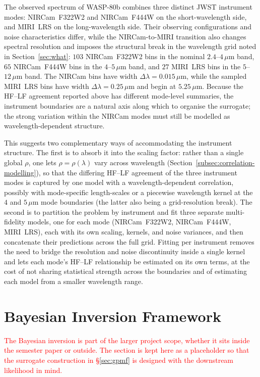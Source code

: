 \documentclass[11pt,a4paper]{article}
\begin{document}
The observed spectrum of WASP-80b combines three distinct JWST instrument
modes: NIRCam~F322W2 and
NIRCam~F444W on the short-wavelength side, and MIRI~LRS on the
long-wavelength side. Their observing configurations and noise characteristics
differ, while the NIRCam-to-MIRI transition also changes spectral resolution
and imposes the structural break in the wavelength grid
noted in Section~\ref{sec:what}: $103$ NIRCam~F322W2 bins in the nominal
$2.4$--$4\,\mu$m band, $65$ NIRCam~F444W bins in the $4$--$5\,\mu$m band,
and $27$ MIRI~LRS bins in the $5$--$12\,\mu$m band. The NIRCam bins have
width $\Delta\lambda=0.015\,\mu$m, while the sampled MIRI~LRS bins have
width $\Delta\lambda=0.25\,\mu$m and begin at $5.25\,\mu$m. Because the
HF--LF agreement reported above has different mode-level summaries, the
instrument boundaries are a natural axis along which to organise the
surrogate; the strong variation within the NIRCam modes must still be modelled
as wavelength-dependent structure.

This suggests two complementary ways of accommodating the instrument
structure. The first is to absorb it into the scaling factor: rather than a
single global $\rho$, one lets $\rho=\rho(\lambda)$ vary across wavelength
(Section~\ref{subsec:correlation-modelling}), so that the differing HF--LF
agreement of the three instrument modes is captured by one model with a
wavelength-dependent correlation, possibly with mode-specific length-scales or
a piecewise wavelength kernel at the $4$ and $5\,\mu$m mode boundaries (the
latter also being a grid-resolution break). The
second is to partition the problem by instrument and fit three separate
multi-fidelity models, one for each mode (NIRCam~F322W2, NIRCam~F444W,
MIRI~LRS), each with its own scaling, kernels, and noise variances, and then
concatenate their predictions across the full grid. Fitting per instrument
removes the need to bridge the resolution and noise discontinuity inside a
single kernel and lets each mode's HF--LF relationship be estimated on its
own terms, at the cost of not sharing statistical strength across the
boundaries and of estimating each model from a smaller wavelength range.

\section{Bayesian Inversion Framework}
\label{sec:bayesian-inversion}
\textcolor{red}{The Bayesian inversion is part of the larger project scope, whether it
sits inside the semester paper or outside.
The section is kept here as a placeholder so that the surrogate construction in \S\ref{sec:gpmf} is designed with the downstream likelihood in mind.}
\end{document}
